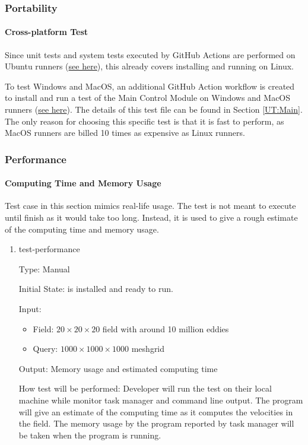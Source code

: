 \documentclass[12pt, titlepage]{article}
\begin{document}
\subsubsection{Portability} \label{ST:Port}
\paragraph{Cross-platform Test\\}
Since unit tests and system tests executed by GitHub Actions are performed on Ubuntu runners (\href{https://github.com/omltcat/turbulent-flow/blob/main/.github/workflows/run-tests.yaml}{see here}), this already covers installing and running on Linux. 

To test Windows and MacOS, an additional GitHub Action workflow is created to install and run a test of the Main Control Module on Windows and MacOS runners (\href{https://github.com/omltcat/turbulent-flow/blob/main/.github/workflows/cross-platform.yaml}{see here}). The details of this test file can be found in Section \ref{UT:Main}. The only reason for choosing this specific test is that it is fast to perform, as MacOS runners are billed 10 times as expensive as Linux runners.

\subsubsection{Performance} \label{ST:Perf}
\paragraph{Computing Time and Memory Usage\\}
Test case in this section mimics real-life usage. The test is not meant to execute until finish as it would take too long. Instead, it is used to give a rough estimate of the computing time and memory usage.

\begin{enumerate}

\item{test-performance\\}

Type: Manual

Initial State: \progname{} is installed and ready to run.

Input: 
\begin{itemize}
  \item Field: $20\times20\times20$ field with around 10 million eddies
  \item Query: $1000\times1000\times1000$ meshgrid
\end{itemize}

Output: Memory usage and estimated computing time

How test will be performed: Developer will run the test on their local machine while monitor task manager and command line output. The program will give an estimate of the computing time as it computes the velocities in the field. The memory usage by the program reported by task manager will be taken when the program is running.

\end{enumerate}
\end{document}
